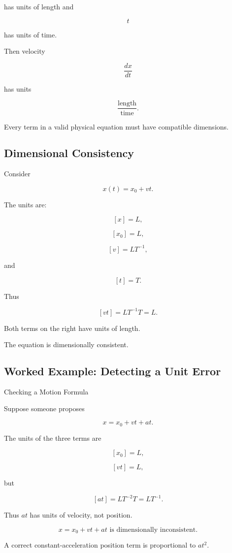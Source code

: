 has units of length and

\[
t
\]

has units of time.

Then velocity

\[
\frac{dx}{dt}
\]

has units

\[
\boxed{
\frac{\text{length}}{\text{time}}.
}
\]

Every term in a valid physical equation must have compatible dimensions.

\subsection{Dimensional Consistency}
\label{subsec:dimensional-consistency}

Consider

\[
x(t)=x_0+vt.
\]

The units are:

\[
[x]=L,
\]

\[
[x_0]=L,
\]

\[
[v]=LT^{-1},
\]

and

\[
[t]=T.
\]

Thus

\[
[vt]
=
LT^{-1}T
=
L.
\]

Both terms on the right have units of length.

The equation is dimensionally consistent.

\subsection{Worked Example: Detecting a Unit Error}
\label{subsec:worked-dimensional-error}

\begin{workedexamplebox}{Checking a Motion Formula}

Suppose someone proposes

\[
x=x_0+vt+at.
\]

The units of the three terms are

\[
[x_0]=L,
\]

\[
[vt]=L,
\]

but

\[
[at]
=
LT^{-2}T
=
LT^{-1}.
\]

Thus \(at\) has units of velocity, not position.

\begin{answerbox}
\[
\boxed{
x=x_0+vt+at
\text{ is dimensionally inconsistent}.
}
\]
\end{answerbox}

A correct constant-acceleration position term is proportional to \(at^2\).

\end{workedexamplebox}

